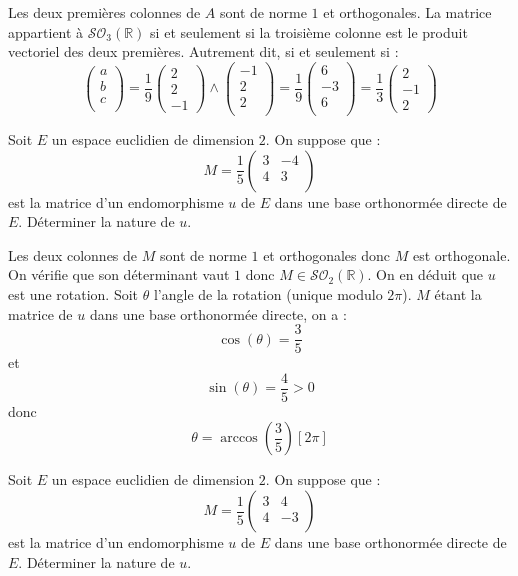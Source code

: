 \documentclass[a4paper,10pt]{report}
\begin{document}
\corr Les deux premières colonnes de $A$ sont de norme $1$ et orthogonales. La matrice appartient à $\mathcal{SO}_3(\mathbb{R})$ si et seulement si la troisième colonne est le produit vectoriel des deux premières. Autrement dit, si et seulement si :
$$ \begin{pmatrix}
a \\
b \\
c \\
\end{pmatrix} = \dfrac{1}{9} \begin{pmatrix}
2 \\
2 \\
-1
\end{pmatrix} \wedge \begin{pmatrix}
-1 \\
2 \\
2 \\
\end{pmatrix} = \dfrac{1}{9} \begin{pmatrix}
6 \\
-3  \\
6 \\
\end{pmatrix} = \dfrac{1}{3} \begin{pmatrix}
2 \\
-1 \\
2
\end{pmatrix}$$

\begin{Exercice}{} Soit $E$ un espace euclidien de dimension $2$. On suppose que :
$$ M = \dfrac{1}{5} \begin{pmatrix}
3 & -4 \\
4 & 3 \\
\end{pmatrix}$$
est la matrice d'un endomorphisme $u$ de $E$ dans une base orthonormée directe de $E$. Déterminer la nature de $u$.
\end{Exercice}

\corr Les deux colonnes de $M$ sont de norme $1$ et orthogonales donc $M$ est orthogonale. On vérifie que son déterminant vaut $1$ donc $M \in \mathcal{SO}_2(\mathbb{R})$. On en déduit que $u$ est une rotation. Soit $\theta$ l'angle de la rotation (unique modulo $2 \pi$). $M$ étant la matrice de $u$ dans une base orthonormée directe, on a :
$$ \cos(\theta)= \dfrac{3}{5}$$
et 
$$ \sin(\theta) = \dfrac{4}{5}>0$$
donc
$$ \theta = \arccos\left( \dfrac{3}{5} \right) [2 \pi]$$

\begin{Exercice}{} Soit $E$ un espace euclidien de dimension $2$. On suppose que :
$$ M = \dfrac{1}{5} \begin{pmatrix}
3 & 4 \\
4 & -3 \\
\end{pmatrix}$$
est la matrice d'un endomorphisme $u$ de $E$ dans une base orthonormée directe de $E$. Déterminer la nature de $u$.
\end{Exercice}
\end{document}
